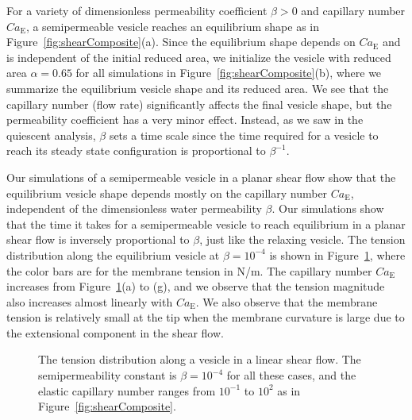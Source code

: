 \documentclass[prb,preprint,showpacs,preprintnumbers,amsmath,amssymb,longbibliography]{revtex4-1}
\begin{document}
For a variety of dimensionless permeability coefficient $\beta>0$ and
capillary number $Ca_\mathrm{E}$, a semipermeable vesicle reaches an
equilibrium shape as in Figure~\ref{fig:shearComposite}(a). Since the
equilibrium shape depends on $Ca_\mathrm{E}$ and is independent of the
initial reduced area, we initialize the vesicle with reduced area
$\alpha = 0.65$ for all simulations in
Figure~\ref{fig:shearComposite}(b), where we summarize the equilibrium
vesicle shape and its reduced area. We see that the capillary number
(flow rate) significantly affects the final vesicle shape, but the
permeability coefficient has a very minor effect. Instead, as we saw in
the quiescent analysis, $\beta$ sets a time scale since the time
required for a vesicle to reach its steady state configuration is
proportional to $\beta^{-1}$.

Our simulations of a semipermeable vesicle in a planar shear flow show
that the equilibrium vesicle shape depends mostly on the capillary
number $Ca_\mathrm{E}$, independent of the dimensionless water
permeability $\beta$. Our simulations show that the time it takes for a
semipermeable vesicle to reach equilibrium in a planar shear flow is
inversely proportional to $\beta$, just like the relaxing vesicle. The
tension distribution along the equilibrium vesicle at $\beta=10^{-4}$ is
shown in Figure~\ref{fig:shearTensions}, where the color bars are for
the membrane tension in N/m. The capillary number $Ca_\mathrm{E}$
increases from Figure~\ref{fig:shearTensions}(a) to (g), and we observe
that the tension magnitude also increases almost linearly with
$Ca_\mathrm{E}$. We also observe that the membrane tension is relatively
small at the tip when the membrane curvature is large due to the
extensional component in the shear flow.
\begin{figure}[hbp]
  \caption{\label{fig:shearTensions} The tension distribution along a
  vesicle in a linear shear flow. The semipermeability constant is
  $\beta = 10^{-4}$ for all these cases, and the elastic capillary
  number ranges from $10^{-1}$ to $10^{2}$ as in
  Figure~\ref{fig:shearComposite}.}
\end{figure}
\end{document}
